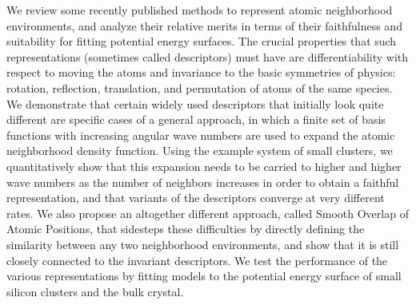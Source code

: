 \documentclass[11pt]{article}
\begin{document}
We review some recently published methods to represent atomic
neighborhood environments, and analyze their relative merits in terms of
their faithfulness and suitability for fitting potential energy
surfaces. The crucial properties that such representations (sometimes
called descriptors) must have are differentiability with respect to
moving the atoms and invariance to the basic symmetries of physics:
rotation, reflection, translation, and permutation of atoms of the same
species. We demonstrate that certain widely used descriptors that
initially look quite different are specific cases of a general approach,
in which a finite set of basis functions with increasing angular wave
numbers are used to expand the atomic neighborhood density function.
Using the example system of small clusters, we quantitatively show that
this expansion needs to be carried to higher and higher wave numbers as
the number of neighbors increases in order to obtain a faithful
representation, and that variants of the descriptors converge at very
different rates. We also propose an altogether different approach,
called Smooth Overlap of Atomic Positions, that sidesteps these
difficulties by directly defining the similarity between any two
neighborhood environments, and show that it is still closely connected
to the invariant descriptors. We test the performance of the various
representations by fitting models to the potential energy surface of
small silicon clusters and the bulk crystal.
\end{document}
